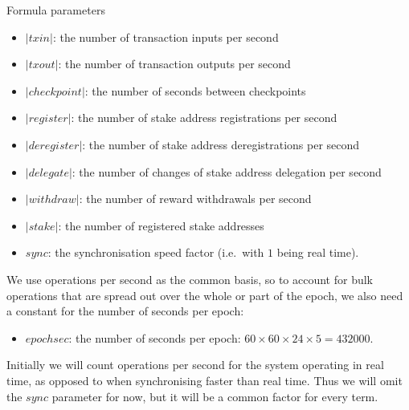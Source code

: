 \documentclass[11pt,a4paper]{article}
\begin{document}
Formula parameters
\begin{itemize}
\item $|\mathit{txin}|$: the number of transaction inputs per second
\item $|\mathit{txout}|$: the number of transaction outputs per second
\item $|\mathit{checkpoint}|$: the number of seconds between checkpoints
\item $|\mathit{register}|$: the number of stake address registrations per second
\item $|\mathit{deregister}|$: the number of stake address deregistrations per second
\item $|\mathit{delegate}|$: the number of changes of stake address delegation per second
\item $|\mathit{withdraw}|$: the number of reward withdrawals per second
\item $|\mathit{stake}|$: the number of registered stake addresses
\item $\mathit{sync}$: the synchronisation speed factor (i.e.~with $1$ being
      real time).
\end{itemize}
We use operations per second as the common basis, so to account for bulk
operations that are spread out over the whole or part of the epoch, we also
need a constant for the number of seconds per epoch:
\begin{itemize}
\item $\mathit{epochsec}$: the number of seconds per epoch:
      $60 \times 60 \times 24 \times 5 = 432000$.
\end{itemize}
Initially we will count operations per second for the system operating in real
time, as opposed to when synchronising faster than real time. Thus we will omit
the $\mathit{sync}$ parameter for now, but it will be a common factor for every
term.
\end{document}
